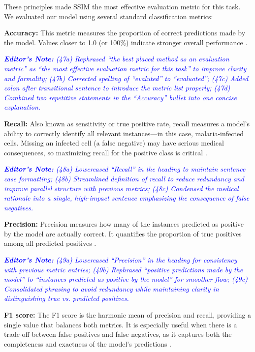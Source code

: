 \documentclass[journal,12pt,onecolumn,draftcls]{IEEEtran}
\newcommand{\editornote}[1]{\par\textit{\textcolor{blue}{\textbf{Editor's Note:} #1}}\par}
\begin{document}
These principles made SSIM the most effective evaluation metric for this task. We evaluated our model using several standard classification metrics:

\textbf{Accuracy:} This metric measures the proportion of correct predictions made by the model. Values closer to 1.0 (or 100\%) indicate stronger overall performance \cite{powers2011}.

\editornote{(47a) Rephrased “the best placed method as an evaluation metric” as “the most effective evaluation metric for this task” to improve clarity and formality;
(47b) Corrected spelling of “evaluted” to “evaluated”;
(47c) Added colon after transitional sentence to introduce the metric list properly;
(47d) Combined two repetitive statements in the “Accuracy” bullet into one concise explanation.}

\textbf{Recall:} Also known as sensitivity or true positive rate, recall measures a model’s ability to correctly identify all relevant instances—in this case, malaria-infected cells. Missing an infected cell (a false negative) may have serious medical consequences, so maximizing recall for the positive class is critical \cite{powers2011}.

\editornote{(48a) Lowercased “Recall” in the heading to maintain sentence case formatting;
(48b) Streamlined definition of recall to reduce redundancy and improve parallel structure with previous metrics;
(48c) Condensed the medical rationale into a single, high-impact sentence emphasizing the consequence of false negatives.}

\textbf{Precision:} Precision measures how many of the instances predicted as positive by the model are actually correct. It quantifies the proportion of true positives among all predicted positives \cite{powers2011}.

\editornote{(49a) Lowercased “Precision” in the heading for consistency with previous metric entries;
(49b) Rephrased “positive predictions made by the model” to “instances predicted as positive by the model” for smoother flow;
(49c) Consolidated phrasing to avoid redundancy while maintaining clarity in distinguishing true vs. predicted positives.}

\textbf{F1 score:} The F1 score is the harmonic mean of precision and recall, providing a single value that balances both metrics. It is especially useful when there is a trade-off between false positives and false negatives, as it captures both the completeness and exactness of the model’s predictions \cite{powers2011}.
\end{document}
